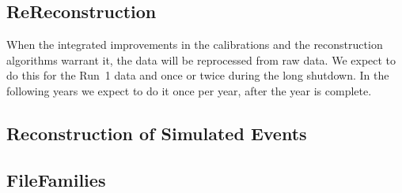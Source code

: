 \subsection{ReReconstruction}
\label{ssec:rereco}

When the integrated improvements in the calibrations and the reconstruction algorithms warrant it, the data will be reprocessed from raw data.
We expect to do this for the Run~1 data and once or twice during the long shutdown.
In the following years we expect to do it once per year, after the year is complete.

\subsection{Reconstruction of Simulated Events}
\label{ssec:recoofsim}


\subsection{FileFamilies}
\label{ssec:filefamilies}
